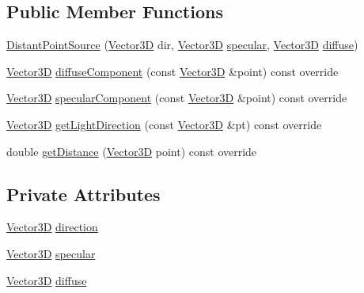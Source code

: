 \subsection*{Public Member Functions}
\begin{DoxyCompactItemize}
\item 
\mbox{\hyperlink{classDistantPointSource_abb36a1b1376c1d895e11ba5a01466a0b}{Distant\+Point\+Source}} (\mbox{\hyperlink{classVector3D}{Vector3D}} dir, \mbox{\hyperlink{classVector3D}{Vector3D}} \mbox{\hyperlink{classDistantPointSource_af6bebc971d66f68f97045712db771411}{specular}}, \mbox{\hyperlink{classVector3D}{Vector3D}} \mbox{\hyperlink{classDistantPointSource_ab9a77355eb9d8fc8596d75c57de4fb5e}{diffuse}})
\item 
\mbox{\hyperlink{classVector3D}{Vector3D}} \mbox{\hyperlink{classDistantPointSource_ae3682ba2e553f38d6c9e4ee1bed9504f}{diffuse\+Component}} (const \mbox{\hyperlink{classVector3D}{Vector3D}} \&point) const override
\item 
\mbox{\hyperlink{classVector3D}{Vector3D}} \mbox{\hyperlink{classDistantPointSource_a14f9c55d090d7d3f7999db70f5174a8c}{specular\+Component}} (const \mbox{\hyperlink{classVector3D}{Vector3D}} \&point) const override
\item 
\mbox{\hyperlink{classVector3D}{Vector3D}} \mbox{\hyperlink{classDistantPointSource_a740ee32c41e2ef6deec1137c86f5b73a}{get\+Light\+Direction}} (const \mbox{\hyperlink{classVector3D}{Vector3D}} \&pt) const override
\item 
double \mbox{\hyperlink{classDistantPointSource_a5d08b5655fc7fc09e5c0d2a0f3046e16}{get\+Distance}} (\mbox{\hyperlink{classVector3D}{Vector3D}} point) const override
\end{DoxyCompactItemize}
\subsection*{Private Attributes}
\begin{DoxyCompactItemize}
\item 
\mbox{\hyperlink{classVector3D}{Vector3D}} \mbox{\hyperlink{classDistantPointSource_a8ed31d9e26d44381c1bd22b5f1b15c6c}{direction}}
\item 
\mbox{\hyperlink{classVector3D}{Vector3D}} \mbox{\hyperlink{classDistantPointSource_af6bebc971d66f68f97045712db771411}{specular}}
\item 
\mbox{\hyperlink{classVector3D}{Vector3D}} \mbox{\hyperlink{classDistantPointSource_ab9a77355eb9d8fc8596d75c57de4fb5e}{diffuse}}
\end{DoxyCompactItemize}


